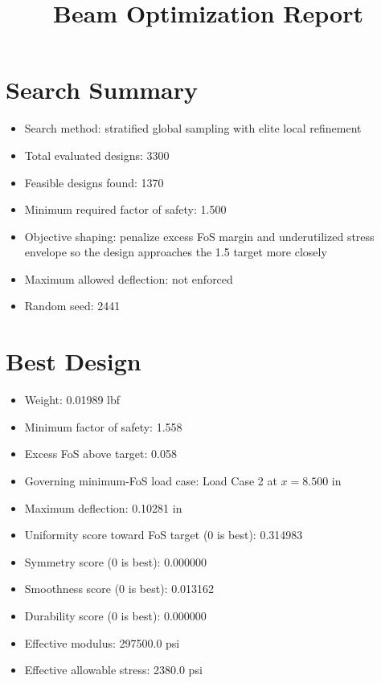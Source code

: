 \documentclass[11pt]{article}
\title{Beam Optimization Report}
\date{}
\begin{document}
\maketitle

\section*{Search Summary}
\begin{itemize}
\item Search method: stratified global sampling with elite local refinement
\item Total evaluated designs: 3300
\item Feasible designs found: 1370
\item Minimum required factor of safety: 1.500
\item Objective shaping: penalize excess FoS margin and underutilized stress envelope so the design approaches the 1.5 target more closely
\item Maximum allowed deflection: not enforced
\item Random seed: 2441
\end{itemize}

\section*{Best Design}
\begin{itemize}
\item Weight: 0.01989 lbf
\item Minimum factor of safety: 1.558
\item Excess FoS above target: 0.058
\item Governing minimum-FoS load case: Load Case 2 at $x=8.500$ in
\item Maximum deflection: 0.10281 in
\item Uniformity score toward FoS target (0 is best): 0.314983
\item Symmetry score (0 is best): 0.000000
\item Smoothness score (0 is best): 0.013162
\item Durability score (0 is best): 0.000000
\item Effective modulus: 297500.0 psi
\item Effective allowable stress: 2380.0 psi
\end{itemize}
\end{document}
